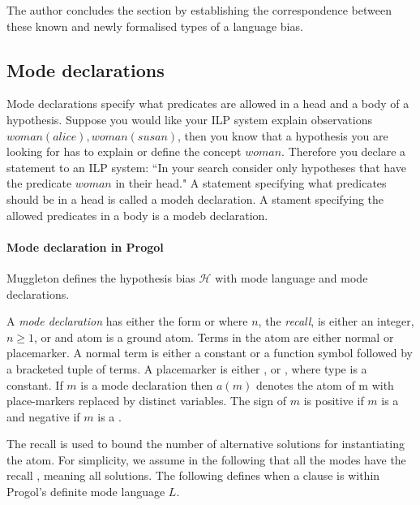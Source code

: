 The author concludes the section by establishing the correspondence between these known and newly formalised types of a language bias.

\subsection{Mode declarations}\label{background_mode_declarations}
Mode declarations specify what predicates are allowed in a head and a body of a hypothesis.
Suppose you would like your ILP system explain observations
$woman(alice), woman(susan)$, then you know that a hypothesis you are looking for has to explain or define the concept $woman$. Therefore you declare a statement to an ILP system: ``In your search consider only hypotheses that have the predicate $woman$ in their head." A statement specifying what predicates should be in a head is called a modeh declaration. A stament specifying the allowed predicates in a body is a modeb declaration.

\paragraph{Mode declaration in Progol}
Muggleton defines the hypothesis bias $\mathcal{H}$ with mode language and mode declarations.
\begin{defn}\cite{muggleton1995inverse}
A \emph{mode declaration} has either the form
 or  where $n$, the \emph{recall}, is either an integer, $n \ge 1$,
or \tc{*} and atom is a ground atom. Terms in the atom are either normal or placemarker. A normal term is either a constant or a function symbol followed by a
bracketed tuple of terms. A placemarker is either ,  or , where
type is a constant. If $m$ is a mode declaration then $a(m)$ denotes the atom of m
with place-markers replaced by distinct variables. The sign of $m$ is positive if $m$
is a  and negative if $m$ is a .
\end{defn}

The recall is used to bound the number of alternative solutions for instantiating
the atom. For simplicity, we assume in the following that all the modes have the
recall \tc{*}, meaning all solutions. The following defines when a clause is within Progol's definite mode language $L$.

